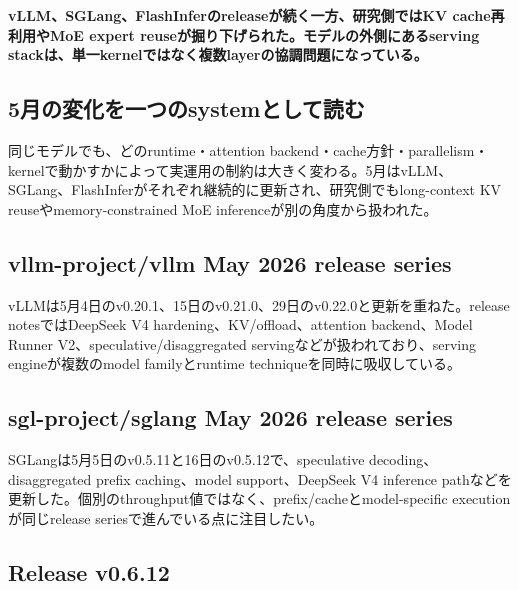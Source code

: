 \noindent\textbf{vLLM、SGLang、FlashInferのreleaseが続く一方、研究側ではKV cache再利用やMoE expert reuseが掘り下げられた。モデルの外側にあるserving stackは、単一kernelではなく複数layerの協調問題になっている。}\autocite{src-3707e05fd2a3,src-5a693cfc6852,src-69c5523286bd,src-74a7052acd7a,src-77e29e3fac8f,src-80b8d67933c0,src-ba75040df3fc,src-c97320147e8c}

\subsection{5月の変化を一つのsystemとして読む}

同じモデルでも、どのruntime・attention backend・cache方針・parallelism・kernelで動かすかによって実運用の制約は大きく変わる。5月はvLLM、SGLang、FlashInferがそれぞれ継続的に更新され、研究側でもlong-context KV reuseやmemory-constrained MoE inferenceが別の角度から扱われた。\autocite{src-3707e05fd2a3,src-5a693cfc6852,src-69c5523286bd,src-74a7052acd7a,src-77e29e3fac8f,src-80b8d67933c0,src-ba75040df3fc,src-c97320147e8c}


\subsection{vllm-project/vllm May 2026 release series}

vLLMは5月4日のv0.20.1、15日のv0.21.0、29日のv0.22.0と更新を重ねた。release notesではDeepSeek V4 hardening、KV/offload、attention backend、Model Runner V2、speculative/disaggregated servingなどが扱われており、serving engineが複数のmodel familyとruntime techniqueを同時に吸収している。\autocite{src-77e29e3fac8f,src-80b8d67933c0,src-c97320147e8c}


\subsection{sgl-project/sglang May 2026 release series}

SGLangは5月5日のv0.5.11と16日のv0.5.12で、speculative decoding、disaggregated prefix caching、model support、DeepSeek V4 inference pathなどを更新した。個別のthroughput値ではなく、prefix/cacheとmodel-specific executionが同じrelease seriesで進んでいる点に注目したい。\autocite{src-5a693cfc6852,src-69c5523286bd}


\subsection{Release v0.6.12}

